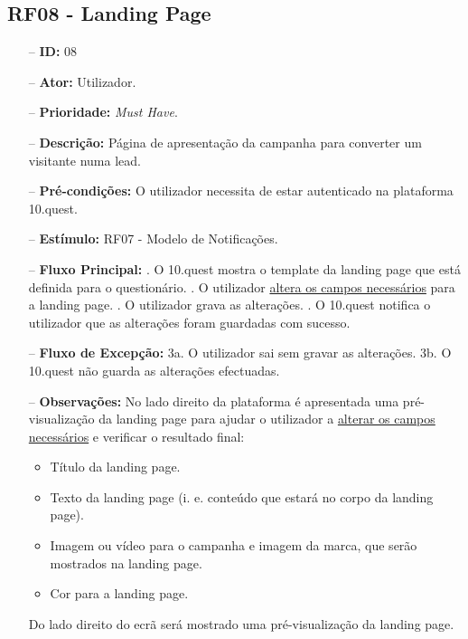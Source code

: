 \subsection{RF08 - Landing Page}
\begin{itemize}
	\item[--] \textbf{ID:} 08
	\item[--]  \textbf{Ator:} Utilizador.
	\item[--]  \textbf{Prioridade:} \textit{Must Have}.
	\item[--]  \textbf{Descrição:} Página de apresentação da campanha para converter um visitante numa lead.
	\item[--]  \textbf{Pré-condições:} O utilizador necessita de estar autenticado na plataforma 10.quest.
	\item[--]  \textbf{Estímulo:} RF07 - Modelo de Notificações.
	\item[--]  \textbf{Fluxo Principal:} 
		. O 10.quest mostra o template da landing page que está definida para o questionário.
		. O utilizador \underline{altera os campos necessários} para a landing page.
		. O utilizador grava as alterações.
		. O 10.quest notifica o utilizador que as alterações foram guardadas com sucesso.
	\item[--]  \textbf{Fluxo de Excepção:} 
		\subitem 3a. O utilizador sai sem gravar as alterações.
		\subitem 3b. O 10.quest não guarda as alterações efectuadas.
	\item[--]  \textbf{Observações:} No lado direito da plataforma é apresentada uma pré-visualização da landing page para ajudar o utilizador a \underline{alterar os campos necessários} e verificar o resultado final:
	\begin{itemize}
		\item Título da landing page.
		\item Texto da landing page (i. e. conteúdo que estará no corpo da landing page).
		\item Imagem ou vídeo para o campanha e imagem da marca, que serão mostrados na landing page.
		\item Cor para a landing page.
	\end{itemize}
	Do lado direito do ecrã será mostrado uma pré-visualização da landing page.
\end{itemize}
\newpage

